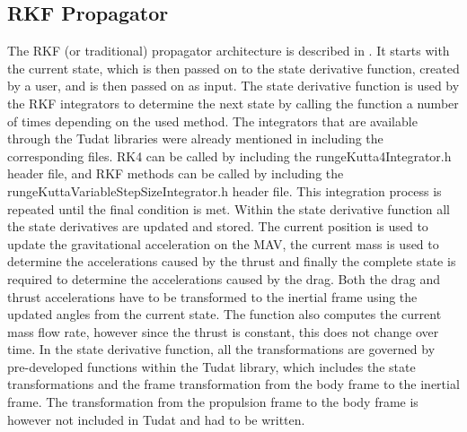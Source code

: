 %




\subsection{\ac{RKF} Propagator}
\label{subsec:rkpropagator}
The \ac{RKF} (or traditional) propagator architecture is described in . It starts with the current state, which is then passed on to the state derivative function, created by a user, and is then passed on as input. The state derivative function is used by the \ac{RKF} integrators to determine the next state by calling the function a number of times depending on the used method. The integrators that are available through the \ac{Tudat} libraries were already mentioned in  including the corresponding files. \ac{RK4} can be called by including the rungeKutta4Integrator.h header file, and \ac{RKF} methods can be called by including the rungeKuttaVariableStepSizeIntegrator.h header file. This integration process is repeated until the final condition is met. Within the state derivative function all the state derivatives are updated and stored. The current position is used to update the gravitational acceleration on the \ac{MAV}, the current mass is used to determine the accelerations caused by the thrust and finally the complete state is required to determine the accelerations caused by the drag. Both the drag and thrust accelerations have to be transformed to the inertial frame using the updated angles from the current state. The function also computes the current mass flow rate, however since the thrust is constant, this does not change over time. In the state derivative function, all the transformations are governed by pre-developed functions within the \ac{Tudat} library, which includes the state transformations and the frame transformation from the body frame to the inertial frame. The transformation from the propulsion frame to the body frame is however not included in \ac{Tudat} and had to be written.


